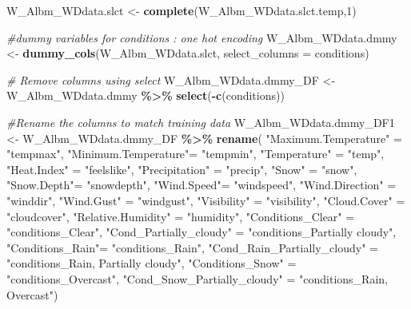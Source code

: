 \documentclass[
]{article}
\newenvironment{Shaded}{\begin{snugshade}}{\end{snugshade}}
\newcommand{\AttributeTok}[1]{\textcolor[rgb]{0.13,0.29,0.53}{#1}}
\newcommand{\CommentTok}[1]{\textcolor[rgb]{0.56,0.35,0.01}{\textit{#1}}}
\newcommand{\DecValTok}[1]{\textcolor[rgb]{0.00,0.00,0.81}{#1}}
\newcommand{\FunctionTok}[1]{\textcolor[rgb]{0.13,0.29,0.53}{\textbf{#1}}}
\newcommand{\NormalTok}[1]{#1}
\newcommand{\OtherTok}[1]{\textcolor[rgb]{0.56,0.35,0.01}{#1}}
\newcommand{\SpecialCharTok}[1]{\textcolor[rgb]{0.81,0.36,0.00}{\textbf{#1}}}
\newcommand{\StringTok}[1]{\textcolor[rgb]{0.31,0.60,0.02}{#1}}
\begin{document}
\begin{Shaded}
\begin{Highlighting}[]
\NormalTok{W\_Albm\_WDdata.slct }\OtherTok{\textless{}{-}} \FunctionTok{complete}\NormalTok{(W\_Albm\_WDdata.slct.temp,}\DecValTok{1}\NormalTok{)}

\CommentTok{\#dummy variables for conditions : one hot encoding}
\NormalTok{W\_Albm\_WDdata.dmmy }\OtherTok{\textless{}{-}} \FunctionTok{dummy\_cols}\NormalTok{(W\_Albm\_WDdata.slct, }
                                         \AttributeTok{select\_columns =} \StringTok{\textquotesingle{}conditions\textquotesingle{}}\NormalTok{)}

\CommentTok{\# Remove columns using select}
\NormalTok{W\_Albm\_WDdata.dmmy\_DF }\OtherTok{\textless{}{-}}\NormalTok{ W\_Albm\_WDdata.dmmy }\SpecialCharTok{\%\textgreater{}\%} 
  \FunctionTok{select}\NormalTok{(}\SpecialCharTok{{-}}\FunctionTok{c}\NormalTok{(conditions))}

\CommentTok{\#Rename the columns to match training data }
\NormalTok{W\_Albm\_WDdata.dmmy\_DF1 }\OtherTok{\textless{}{-}}\NormalTok{ W\_Albm\_WDdata.dmmy\_DF }\SpecialCharTok{\%\textgreater{}\%} 
        \FunctionTok{rename}\NormalTok{( }
          \StringTok{"Maximum.Temperature"} \OtherTok{=} \StringTok{"tempmax"}\NormalTok{,}
          \StringTok{"Minimum.Temperature"}\OtherTok{=} \StringTok{"tempmin"}\NormalTok{,}
          \StringTok{"Temperature"} \OtherTok{=} \StringTok{"temp"}\NormalTok{,}
          \StringTok{"Heat.Index"} \OtherTok{=} \StringTok{"feelslike"}\NormalTok{,}
          \StringTok{"Precipitation"} \OtherTok{=} \StringTok{"precip"}\NormalTok{,}
          \StringTok{"Snow"} \OtherTok{=} \StringTok{"snow"}\NormalTok{,}
          \StringTok{"Snow.Depth"}\OtherTok{=} \StringTok{"snowdepth"}\NormalTok{,}
          \StringTok{"Wind.Speed"}\OtherTok{=} \StringTok{"windspeed"}\NormalTok{,}
          \StringTok{"Wind.Direction"} \OtherTok{=} \StringTok{"winddir"}\NormalTok{,}
          \StringTok{"Wind.Gust"} \OtherTok{=} \StringTok{"windgust"}\NormalTok{,}
          \StringTok{"Visibility"} \OtherTok{=} \StringTok{"visibility"}\NormalTok{,}
          \StringTok{"Cloud.Cover"} \OtherTok{=} \StringTok{"cloudcover"}\NormalTok{,}
          \StringTok{"Relative.Humidity"} \OtherTok{=} \StringTok{"humidity"}\NormalTok{,}
          \StringTok{"Conditions\_Clear"} \OtherTok{=} \StringTok{"conditions\_Clear"}\NormalTok{,}
          \StringTok{"Cond\_Partially\_cloudy"} \OtherTok{=} \StringTok{"conditions\_Partially cloudy"}\NormalTok{,}
          \StringTok{"Conditions\_Rain"}\OtherTok{=} \StringTok{"conditions\_Rain"}\NormalTok{,}
          \StringTok{"Cond\_Rain\_Partially\_cloudy"} \OtherTok{=} \StringTok{"conditions\_Rain, Partially cloudy"}\NormalTok{,}
          \StringTok{"Conditions\_Snow"} \OtherTok{=} \StringTok{"conditions\_Overcast"}\NormalTok{,}
          \StringTok{"Cond\_Snow\_Partially\_cloudy"} \OtherTok{=} \StringTok{"conditions\_Rain, Overcast"}\NormalTok{)}
\end{Highlighting}
\end{Shaded}
\end{document}
